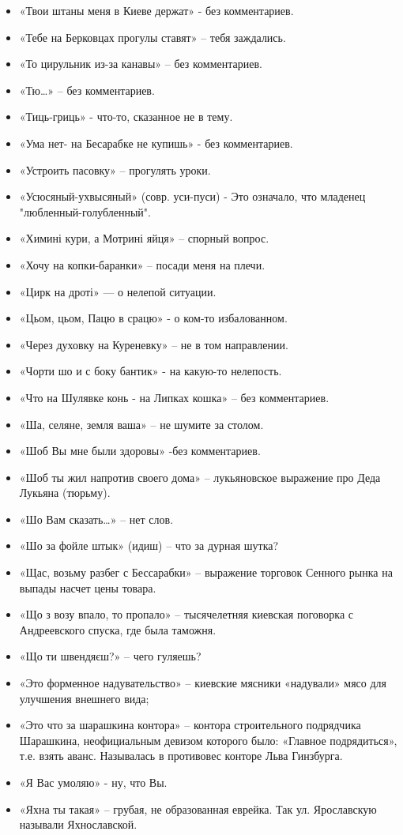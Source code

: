 \begin{itemize}
\item  «Твои штаны меня в Киеве держат» - без комментариев.
\item  «Тебе на Берковцах прогулы ставят» – тебя заждались.
\item  «То цирульник из-за канавы» – без комментариев.
\item  «Тю…» – без комментариев.
\item  «Тиць-гриць» - что-то, сказанное не в тему.
\item  «Ума нет- на Бесарабке не купишь» - без комментариев.
\item  «Устроить пасовку» – прогулять уроки.
\item  «Усюсяный-ухвысяный» (совр. уси-пуси) - Это означало, что младенец "любленный-голубленный".
\item  «Химині кури, а Мотрині яйця» – спорный вопрос.
\item  «Хочу на копки-баранки» – посади меня на плечи.
\item  «Цирк на дроті» — о нелепой ситуации.
\item  «Цьом, цьом, Пацю в срацю»  - о ком-то избалованном.
\item  «Через духовку на Куреневку» – не в том направлении.
\item  «Чорти шо и с боку бантик» - на какую-то нелепость.
\item  «Что на Шулявке конь - на Липках кошка» – без комментариев.
\item  «Ша, селяне, земля ваша» – не шумите за столом.
\item  «Шоб Вы мне были здоровы» -без комментариев.
\item  «Шоб ты жил напротив своего дома» – лукьяновское выражение про Деда Лукьяна (тюрьму).
\item  «Шо Вам сказать…» – нет слов.
\item  «Шо за фойле штык» (идиш) – что за дурная шутка?
\item  «Щас, возьму разбег с Бессарабки» – выражение торговок Сенного рынка на выпады насчет цены товара.
\item  «Що з возу впало, то пропало» – тысячелетняя киевская поговорка с Андреевского спуска, где была таможня.
\item  «Що ти швендяєш?» – чего гуляешь?
\item  «Это форменное надувательство» – киевские мясники «надували» мясо для улучшения внешнего вида;
\item  «Это что за шарашкина контора» – контора строительного подрядчика Шарашкина, неофициальным девизом которого было: «Главное подрядиться», т.е. взять аванс. Называлась в противовес конторе Льва Гинзбурга.
\item  «Я Вас умоляю» -  ну, что Вы.
\item  «Яхна ты такая» – грубая, не образованная еврейка. Так ул. Ярославскую называли Яхнославской.

\end{itemize}
